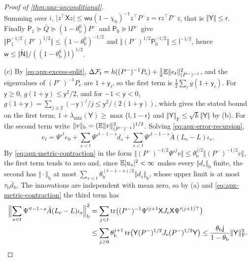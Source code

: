 \begin{proof}[Proof of \cref{thm:apx-unconditional}]
\begin{equation*}
\end{equation*}
Summing over $i$, $\lvert z^\top\mathsf Xz\rvert\le\mathsf w\mathsf u(1-\chi_{\mathrm b})^{-1}z^\top P^-z=\mathsf rz^\top P^-z$, that is $\Vert\mathsf Y\Vert\le\mathsf r$. Finally $\mathsf P_1\succeq\bar Q\succeq(1-\theta^0_{\mathrm b})P^-$ and $\mathsf P_0\succeq\mathsf lP^-$ give $\Vert\mathsf P_1^{-1/2}(P^-)^{1/2}\Vert\le(1-\theta^0_{\mathrm b})^{-1/2}$ and $\Vert(P^-)^{1/2}\mathsf P_0^{-1/2}\Vert\le\mathsf l^{-1/2}$, hence $\mathsf w\le\Vert\tilde{\mathsf N}\Vert/((1-\theta^0_{\mathrm b})\mathsf l)^{1/2}$.

(c) By \cref{eq:apx-excess-split}, $\Delta\mathcal F_t=h((P^-)^{-1}P_{\mathrm e})+\frac12\mathbb{E}\Vert e_t\Vert^2_{(P^-)^{-1}}$, and the eigenvalues of $(P^-)^{-1}P_{\mathrm e}$ are $1+\mathsf y_i$, so the first term is $\frac12\sum_ig(1+\mathsf y_i)$. For $\mathsf y\ge0$, $g(1+\mathsf y)\le\mathsf y^2/2$, and for $-1<\mathsf y<0$, $g(1+\mathsf y)=\sum_{j\ge2}(-\mathsf y)^j/j\le\mathsf y^2/(2(1+\mathsf y))$, which gives the stated bound on the first term; $1+\lambda_{\min}(\mathsf Y)\ge\max\{\mathsf l,1-\mathsf r\}$ and $\Vert\mathsf Y\Vert_{\mathrm F}\le\sqrt k\Vert\mathsf Y\Vert$ by (b). For the second term write $\Vert v\Vert_{\mathrm b}=(\mathbb{E}\Vert v\Vert^2_{(P^-)^{-1}})^{1/2}$. Solving \cref{eq:apx-error-recursion},
\begin{equation*}
e_t=\Psi'^te_0+\sum_{s<t}\Psi'^{t-1-s}d_s+\sum_{s<t}\Psi'^{t-1-s}\bar A(L_{\mathrm e}-L)\iota_s .
\end{equation*}
By \cref{eq:apx-metric-contraction} in the form $\Vert(P^-)^{-1/2}\Psi'^jv\Vert\le\theta_{\mathrm b}^{j/2}\Vert(P^-)^{-1/2}v\Vert$, the first term tends to zero and, since $\mathbb{E}\lvert u_s\rvert^2<\infty$ makes every $\Vert d_s\Vert_{\mathrm b}$ finite, the second has $\Vert\cdot\Vert_{\mathrm b}$ at most $\sum_{s<t}\theta_{\mathrm b}^{(t-1-s)/2}\Vert d_s\Vert_{\mathrm b}$, whose upper limit is at most $\tau_{\mathrm b}\bar d_{\mathrm b}$. The innovations are independent with mean zero, so by (a) and \cref{eq:apx-metric-contraction} the third term has
\begin{equation*}
\begin{aligned}
\Bigl\Vert\sum_{s<t}\Psi'^{t-1-s}\bar A(L_{\mathrm e}-L)\iota_s\Bigr\Vert_{\mathrm b}^2&=\sum_{j<t}\tr\bigl((P^-)^{-1}\Psi'^{j+1}\mathsf XJ_{\mathrm e}\mathsf X\Psi'^{(j+1)\top}\bigr)\\
&\le\sum_{j\ge0}\theta_{\mathrm b}^{j+1}\tr\bigl(\mathsf Y(P^-)^{1/2}J_{\mathrm e}(P^-)^{1/2}\mathsf Y\bigr)\le\frac{\theta_{\mathrm b}\mathsf j}{1-\theta_{\mathrm b}}\Vert\mathsf Y\Vert_{\mathrm F}^2 .

\end{aligned}
\end{equation*}
\end{proof}
